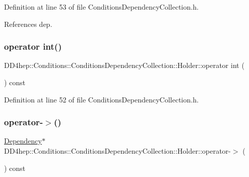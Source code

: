 Definition at line 53 of file Conditions\+Dependency\+Collection.\+h.



References dep.

\hypertarget{struct_d_d4hep_1_1_conditions_1_1_conditions_dependency_collection_1_1_holder_a486fb723b216007a9bec6cadd7045137}{}\label{struct_d_d4hep_1_1_conditions_1_1_conditions_dependency_collection_1_1_holder_a486fb723b216007a9bec6cadd7045137} 
\subsubsection{\texorpdfstring{operator int()}{operator int()}}
{\footnotesize\ttfamily D\+D4hep\+::\+Conditions\+::\+Conditions\+Dependency\+Collection\+::\+Holder\+::operator int (\begin{DoxyParamCaption}{ }\end{DoxyParamCaption}) const\hspace{0.3cm}{\ttfamily [inline]}}



Definition at line 52 of file Conditions\+Dependency\+Collection.\+h.

\hypertarget{struct_d_d4hep_1_1_conditions_1_1_conditions_dependency_collection_1_1_holder_aa9dbe25e86303339834ac6307b19dda6}{}\label{struct_d_d4hep_1_1_conditions_1_1_conditions_dependency_collection_1_1_holder_aa9dbe25e86303339834ac6307b19dda6} 
\subsubsection{\texorpdfstring{operator-\/$>$()}{operator->()}}
{\footnotesize\ttfamily \hyperlink{class_d_d4hep_1_1_conditions_1_1_conditions_dependency_collection_a87252585d3e17ae82813c039b1b47e8a}{Dependency}$\ast$ D\+D4hep\+::\+Conditions\+::\+Conditions\+Dependency\+Collection\+::\+Holder\+::operator-\/$>$ (\begin{DoxyParamCaption}{ }\end{DoxyParamCaption}) const\hspace{0.3cm}{\ttfamily [inline]}}



